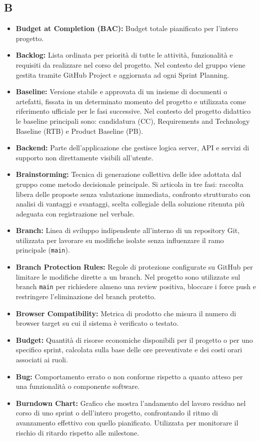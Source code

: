 \subsection*{B}
\begin{itemize}[leftmargin=*]
      \item \textbf{Budget at Completion (BAC):} Budget totale pianificato per 
      l'intero progetto.
      \item \textbf{Backlog:} Lista ordinata per priorità di tutte le attività, funzionalità
      e requisiti da realizzare nel corso del progetto. Nel contesto del gruppo viene
      gestita tramite GitHub Project e aggiornata ad ogni Sprint
      Planning.
      \item \textbf{Baseline:} Versione stabile e approvata di un insieme di
          documenti o artefatti, fissata in un determinato momento del progetto
          e utilizzata come riferimento ufficiale per le fasi successive. Nel
          contesto del progetto didattico le baseline principali sono: candidatura
          (CC), Requirements and Technology Baseline (RTB) e Product Baseline (PB).
      \item \textbf{Backend:} Parte dell'applicazione che gestisce logica server, API e
      servizi di supporto non direttamente visibili all'utente.
      \item \textbf{Brainstorming:} Tecnica di generazione collettiva delle idee adottata
      dal gruppo come metodo decisionale principale. Si articola in tre fasi:
      raccolta libera delle proposte senza valutazione immediata, confronto
      strutturato con analisi di vantaggi e svantaggi, scelta collegiale della
      soluzione ritenuta più adeguata con registrazione nel verbale.
      \item \textbf{Branch:} Linea di sviluppo indipendente all'interno di un
          repository Git, utilizzata per lavorare su modifiche isolate senza
          influenzare il ramo principale (\texttt{main}).
      \item \textbf{Branch Protection Rules:} Regole di protezione configurate su GitHub per limitare le modifiche dirette a un branch. Nel progetto sono utilizzate sul branch \texttt{main} per richiedere almeno una review positiva, bloccare i force push e restringere l'eliminazione del branch protetto.
      \item \textbf{Browser Compatibility:} Metrica di prodotto che misura il numero di
browser target su cui il sistema è verificato o testato.
      \item \textbf{Budget:} Quantità di risorse economiche disponibili per il progetto o per uno specifico sprint, calcolata sulla base delle ore preventivate e dei costi orari associati ai ruoli.
      \item \textbf{Bug:} Comportamento errato o non conforme rispetto a quanto atteso
      per una funzionalità o componente software.
      \item \textbf{Burndown Chart:} Grafico che mostra l'andamento del lavoro residuo nel
      corso di uno sprint o dell'intero progetto, confrontando il ritmo di avanzamento
      effettivo con quello pianificato. Utilizzata per monitorare il rischio di ritardo
      rispetto alle milestone.
\end{itemize}
 
